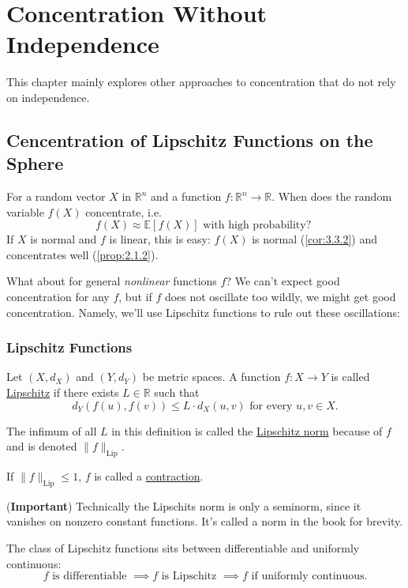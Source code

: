 \section{Concentration Without Independence}
This chapter mainly explores other approaches to concentration that do not rely on independence.



\subsection{Cencentration of Lipschitz Functions on the Sphere}
For a random vector $X$ in $\mathbb{R}^n$ and a function $f: \mathbb{R}^n \to \mathbb{R}$. When does the 
random variable $f(X)$ concentrate, i.e.
\[ f(X) \approx \mathbb{E}[f(X)] \text{ with high probability? } \]
If $X$ is normal and $f$ is linear, this is easy: $f(X)$ is normal (\cref{cor:3.3.2}) and concentrates well 
(\cref{prop:2.1.2}).

What about for general \textit{nonlinear} functions $f$? We can't expect good concentration for any $f$, 
but if $f$ does not oscillate too wildly, we might get good concentration. Namely, we'll use Lipschitz 
functions to rule out these oscillations:


\subsubsection{Lipschitz Functions}
\begin{definition}[]
\label{def:5.1.1}
Let $(X, d_X)$ and $(Y, d_Y)$ be metric spaces. A function $f:X \to Y$ is called \underline{Lipschitz} if 
there exists $L \in \mathbb{R}$ such that 
\[ d_Y(f(u), f(v)) \leq L \cdot d_X(u, v) \text{ for every } u, v \in X. \]

The infimum of all $L$ in this definition is called the \underline{Lipschitz norm} because of $f$ and is denoted 
$\lVert f \rVert_{\mathrm{Lip}}$.

If $\lVert f \rVert_{\mathrm{Lip}} \leq 1$, $f$ is called a \underline{contraction}.
\end{definition}

(\textbf{Important}) Technically the Lipschits norm is only a seminorm, since it vanishes on nonzero constant 
functions. It's called a norm in the book for brevity.

The class of Lipschitz functions sits between differentiable and uniformly continuous: 
\[ f \text{ is differentiable } \implies f \text{ is Lipschitz } \implies f \text{ if uniformly continuous.} \]

